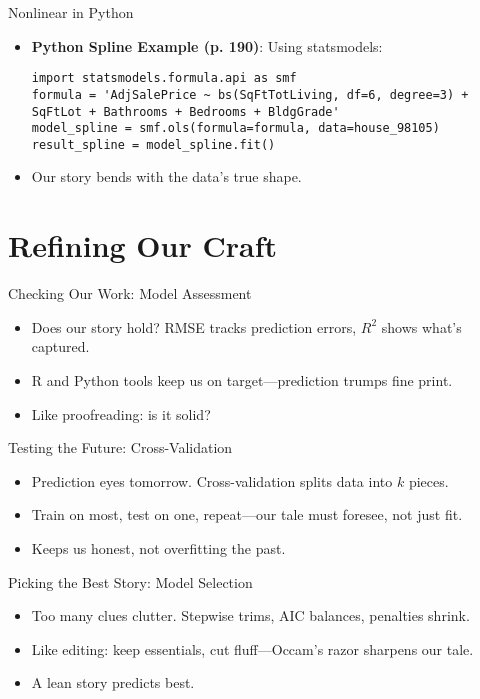\documentclass{beamer}
\begin{document}
\begin{frame}[fragile]{Nonlinear in Python}
  \begin{itemize}
    \item \textbf{Python Spline Example (p. 190)}: Using statsmodels:
      \lstset{language=Python}
      \begin{lstlisting}
import statsmodels.formula.api as smf
formula = 'AdjSalePrice ~ bs(SqFtTotLiving, df=6, degree=3) + SqFtLot + Bathrooms + Bedrooms + BldgGrade'
model_spline = smf.ols(formula=formula, data=house_98105)
result_spline = model_spline.fit()
      \end{lstlisting}
    \item Our story bends with the data’s true shape.
  \end{itemize}
\end{frame}

\section{Refining Our Craft}

\begin{frame}{Checking Our Work: Model Assessment}
  \begin{itemize}
    \item Does our story hold? RMSE tracks prediction errors, $R^2$ shows what’s captured.
    \item R and Python tools keep us on target—prediction trumps fine print.
    \item Like proofreading: is it solid?
  \end{itemize}
\end{frame}

\begin{frame}{Testing the Future: Cross-Validation}
  \begin{itemize}
    \item Prediction eyes tomorrow. Cross-validation splits data into $k$ pieces.
    \item Train on most, test on one, repeat—our tale must foresee, not just fit.
    \item Keeps us honest, not overfitting the past.
  \end{itemize}
\end{frame}

\begin{frame}{Picking the Best Story: Model Selection}
  \begin{itemize}
    \item Too many clues clutter. Stepwise trims, AIC balances, penalties shrink.
    \item Like editing: keep essentials, cut fluff—Occam’s razor sharpens our tale.
    \item A lean story predicts best.
  \end{itemize}
\end{frame}
\end{document}
